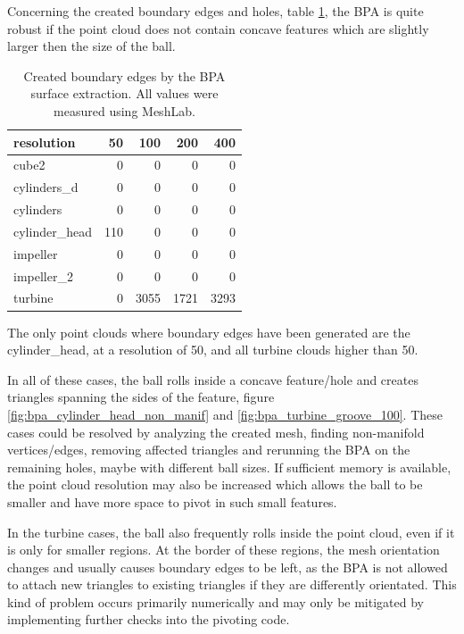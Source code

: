 Concerning the created boundary edges and holes, \cf table \ref{tbl:bpa_boundary edges}, the BPA is quite robust if the point cloud does not contain concave features which are slightly larger then the size of the ball.
%
\begin{table}
	\centering
	\begin{tabular}{l|r|r|r|r}
		resolution     &  50 &  100 &  200 &  400 \\
		\midrule
		cube2          &   0 &    0 &    0 &    0 \\
		cylinders\_d   &   0 &    0 &    0 &    0 \\
		cylinders      &   0 &    0 &    0 &    0 \\
		cylinder\_head & 110 &    0 &    0 &    0 \\
		impeller       &   0 &    0 &    0 &    0 \\
		impeller\_2    &   0 &    0 &    0 &    0 \\
		turbine        &   0 & 3055 & 1721 & 3293 \\
	\end{tabular}
	\caption{
		Created boundary edges by the BPA surface extraction.
		All values were measured using MeshLab.
	}
	\label{tbl:bpa_boundary edges}
\end{table}
%
The only point clouds where boundary edges have been generated are the cylinder\_head, at a resolution of 50, and all turbine clouds higher than 50.

In all of these cases, the ball rolls inside a concave feature/hole and creates triangles spanning the sides of the feature, \cf figure \ref{fig:bpa_cylinder_head_non_manif} and \ref{fig:bpa_turbine_groove_100}.
These cases could be resolved by analyzing the created mesh, finding non-manifold vertices/edges, removing affected triangles and rerunning the BPA on the remaining holes, maybe with different ball sizes.
If sufficient memory is available, the point cloud resolution may also be increased which allows the ball to be smaller and have more space to pivot in such small features.

In the turbine cases, the ball also frequently rolls inside the point cloud, even if it is only for smaller regions.
At the border of these regions, the mesh orientation changes and usually causes boundary edges to be left, as the BPA is not allowed to attach new triangles to existing triangles if they are differently orientated.
This kind of problem occurs primarily numerically and may only be mitigated by implementing further checks into the pivoting code.


